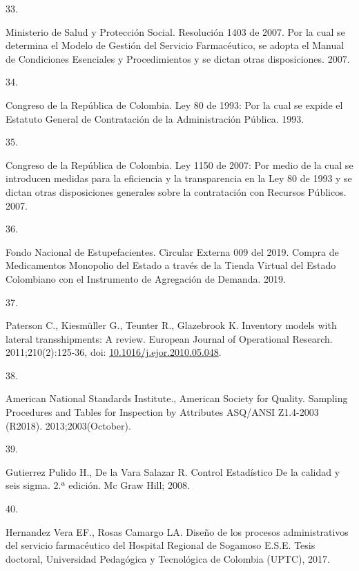 \documentclass[
]{book}
\newlength{\cslhangindent}
\newlength{\csllabelwidth}
\newlength{\cslentryspacingunit} %
\newenvironment{CSLReferences}[2] %
 {%
  \setlength{\parindent}{0pt}
  \ifodd #1
  \let\oldpar\par
  \def\par{\hangindent=\cslhangindent\oldpar}
  \fi
  \setlength{\parskip}{#2\cslentryspacingunit}
 }%
 {}
\newcommand{\CSLLeftMargin}[1]{\parbox[t]{\csllabelwidth}{#1}}
\newcommand{\CSLRightInline}[1]{\parbox[t]{\linewidth - \csllabelwidth}{#1}\break}
\begin{document}
\begin{CSLReferences}{0}{0}
\leavevmode{}%
\CSLLeftMargin{33. }
\CSLRightInline{Ministerio de Salud y Protección Social. {Resoluci{ó}n 1403 de 2007. Por la cual se determina el Modelo de Gesti{ó}n del Servicio Farmac{é}utico, se adopta el Manual de Condiciones Esenciales y Procedimientos y se dictan otras disposiciones}. 2007.}

\leavevmode{}%
\CSLLeftMargin{34. }
\CSLRightInline{Congreso de la República de Colombia. {Ley 80 de 1993: Por la cual se expide el Estatuto General de Contrataci{ó}n de la Administraci{ó}n P{ú}blica}. 1993.}

\leavevmode{}%
\CSLLeftMargin{35. }
\CSLRightInline{Congreso de la República de Colombia. {Ley 1150 de 2007: Por medio de la cual se introducen medidas para la eficiencia y la transparencia en la Ley 80 de 1993 y se dictan otras disposiciones generales sobre la contrataci{ó}n con Recursos P{ú}blicos.} 2007.}

\leavevmode{}%
\CSLLeftMargin{36. }
\CSLRightInline{Fondo Nacional de Estupefacientes. {Circular Externa 009 del 2019. Compra de Medicamentos Monopolio del Estado a trav{é}s de la Tienda Virtual del Estado Colombiano con el Instrumento de Agregaci{ó}n de Demanda}. 2019.}

\leavevmode{}%
\CSLLeftMargin{37. }
\CSLRightInline{Paterson C., Kiesmüller G., Teunter R., Glazebrook K. {Inventory models with lateral transshipments: A review}. European Journal of Operational Research. 2011;210(2):125-36, doi: \href{https://doi.org/10.1016/j.ejor.2010.05.048}{10.1016/j.ejor.2010.05.048}.}

\leavevmode{}%
\CSLLeftMargin{38. }
\CSLRightInline{American National Standards Institute., American Society for Quality. {Sampling Procedures and Tables for Inspection by Attributes ASQ/ANSI Z1.4-2003 (R2018)}. 2013;2003(October).}

\leavevmode{}%
\CSLLeftMargin{39. }
\CSLRightInline{Gutierrez Pulido H., De la Vara Salazar R. {Control Estad{í}stico De la calidad y seis sigma}. 2.ª edición. Mc Graw Hill; 2008.}

\leavevmode{}%
\CSLLeftMargin{40. }
\CSLRightInline{Hernandez Vera EF., Rosas Camargo LA. {Dise{ñ}o de los procesos administrativos del servicio farmac{é}utico del Hospital Regional de Sogamoso E.S.E.} Tesis doctoral, Universidad Pedag{ó}gica y Tecnol{ó}gica de Colombia (UPTC), 2017.}


\end{CSLReferences}
\end{document}
